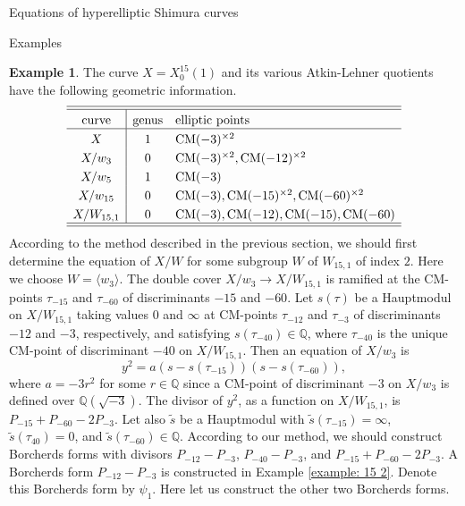 \documentclass{amsart}
\newcounter{lemma}
\theoremstyle{definition}
\newtheorem{Example}[lemma]{Example}
\def\Q{\mathbb Q}
\def\gen#1{\langle #1\rangle}
\def\CM{\mathrm{CM}}
\def\wt{\widetilde}
\begin{document}
\begin{section}{Equations of hyperelliptic Shimura curves}
\begin{subsection}{Examples}
\begin{Example}
  The curve $X=X_0^{15}(1)$ and its various Atkin-Lehner quotients have
  the following geometric information.
  $$ \extrarowheight3pt
  \begin{array}{c|cl} \hline\hline
  \text{curve} & \text{genus} & \text{elliptic points} \\ \hline
  X & 1 & \CM(-3)^{\times 2} \\
  X/w_3 & 0 & \CM(-3)^{\times 2}, \CM(-12)^{\times 2} \\
  X/w_5 & 1 & \CM(-3) \\
  X/w_{15} & 0 & \CM(-3), \CM(-15)^{\times 2},
                 \CM(-60)^{\times 2} \\
  X/W_{15,1} & 0 & \CM(-3), \CM(-12), \CM(-15), \CM(-60) \\
  \hline\hline
  \end{array}
  $$
  According to the method described in the previous section, we
  should first determine the equation of $X/W$ for some subgroup $W$
  of $W_{15,1}$ of index $2$. Here we choose $W=\gen{w_3}$. The
  double cover $X/w_3\to X/W_{15,1}$ is ramified at the CM-points
  $\tau_{-15}$ and $\tau_{-60}$ of discriminants $-15$ and $-60$. Let
  $s(\tau)$ be a Hauptmodul on $X/W_{15,1}$ taking values $0$
  and $\infty$ at CM-points $\tau_{-12}$ and $\tau_{-3}$ of
  discriminants $-12$ and $-3$, respectively, and satisfying
  $s(\tau_{-40})\in\Q$, where $\tau_{-40}$ is the unique CM-point
  of discriminant $-40$ on $X/W_{15,1}$. Then an equation of $X/w_3$ is
  $$
    y^2=a(s-s(\tau_{-15}))(s-s(\tau_{-60})),
  $$
  where $a=-3r^2$ for some $r\in\Q$ since a CM-point of discriminant
  $-3$ on $X/w_3$ is defined over $\Q(\sqrt{-3})$. The divisor of
  $y^2$, as a function on $X/W_{15,1}$, is $P_{-15}+P_{-60}-2P_{-3}$.
  Let also $\wt s$ be a Hauptmodul with $\wt s(\tau_{-15})=\infty$,
  $\wt s(\tau_{40})=0$, and $\wt s(\tau_{-60})\in\Q$.
  According to our method, we should construct Borcherds forms with
  divisors $P_{-12}-P_{-3}$, $P_{-40}-P_{-3}$, and
  $P_{-15}+P_{-60}-2P_{-3}$. A Borcherds form $P_{-12}-P_{-3}$ is
  constructed in Example \ref{example: 15 2}. Denote this Borcherds
  form by $\psi_1$. Here let us construct
  the other two Borcherds forms.


\end{Example}
\end{subsection}
\end{section}
\end{document}
